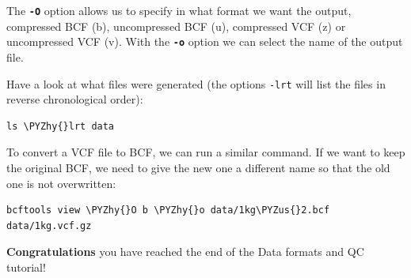 \documentclass[11pt]{article}
\makeatletter
\def\PYZus{\char`\_}
\def\PYZhy{\char`\-}
\newcommand{\boxspacing}{\kern\kvtcb@left@rule\kern\kvtcb@boxsep}
\newcommand{\prompt}[4]{
        {\ttfamily\llap{{\color{blue}\LARGE\faKeyboardO\hspace{3pt}#4}}\vspace{-\baselineskip}}
    }
\makeatother
\begin{document}
    The \textbf{\texttt{-O}} option allows us to specify in what format we
want the output, compressed BCF (b), uncompressed BCF (u), compressed
VCF (z) or uncompressed VCF (v). With the \textbf{\texttt{-o}} option we
can select the name of the output file.

Have a look at what files were generated (the options \texttt{-lrt} will
list the files in reverse chronological order):

    \begin{tcolorbox}[breakable, size=fbox, boxrule=1pt, pad at break*=1mm,colback=cellbackground, colframe=cellborder]
\prompt{In}{incolor}{ }{\boxspacing}
\begin{Verbatim}[commandchars=\\\{\}]
ls \PYZhy{}lrt data
\end{Verbatim}
\end{tcolorbox}

    To convert a VCF file to BCF, we can run a similar command. If we want
to keep the original BCF, we need to give the new one a different name
so that the old one is not overwritten:

    \begin{tcolorbox}[breakable, size=fbox, boxrule=1pt, pad at break*=1mm,colback=cellbackground, colframe=cellborder]
\prompt{In}{incolor}{ }{\boxspacing}
\begin{Verbatim}[commandchars=\\\{\}]
bcftools view \PYZhy{}O b \PYZhy{}o data/1kg\PYZus{}2.bcf data/1kg.vcf.gz
\end{Verbatim}
\end{tcolorbox}

    \textbf{Congratulations} you have reached the end of the Data formats
and QC tutorial!


\end{document}
